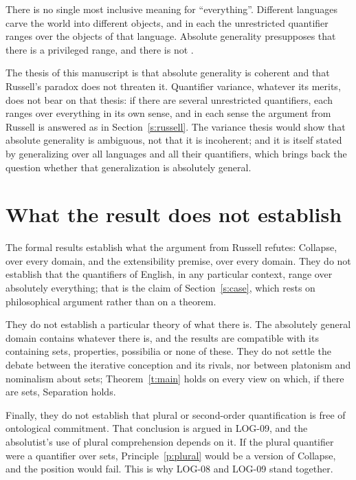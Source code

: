 \documentclass{situationist-preprint}
\begin{document}
\begin{objection}
There is no single most inclusive meaning for \enquote{everything}. Different languages carve the world into different objects, and in each the unrestricted quantifier ranges over the objects of that language. Absolute generality presupposes that there is a privileged range, and there is not \citep[compare][]{Warren2017}.
\end{objection}

\begin{reply}
The thesis of this manuscript is that absolute generality is coherent and that Russell's paradox does not threaten it. Quantifier variance, whatever its merits, does not bear on that thesis: if there are several unrestricted quantifiers, each ranges over everything in its own sense, and in each sense the argument from Russell is answered as in Section~\ref{s:russell}. The variance thesis would show that absolute generality is ambiguous, not that it is incoherent; and it is itself stated by generalizing over all languages and all their quantifiers, which brings back the question whether that generalization is absolutely general.
\end{reply}

\section{What the result does not establish}

The formal results establish what the argument from Russell refutes: Collapse, over every domain, and the extensibility premise, over every domain. They do not establish that the quantifiers of English, in any particular context, range over absolutely everything; that is the claim of Section~\ref{s:case}, which rests on philosophical argument rather than on a theorem.

They do not establish a particular theory of what there is. The absolutely general domain contains whatever there is, and the results are compatible with its containing sets, properties, possibilia or none of these. They do not settle the debate between the iterative conception and its rivals, nor between platonism and nominalism about sets; Theorem~\ref{t:main} holds on every view on which, if there are sets, Separation holds.

Finally, they do not establish that plural or second-order quantification is free of ontological commitment. That conclusion is argued in LOG-09, and the absolutist's use of plural comprehension depends on it. If the plural quantifier were a quantifier over sets, Principle~\ref{p:plural} would be a version of Collapse, and the position would fail. This is why LOG-08 and LOG-09 stand together.
\end{document}
